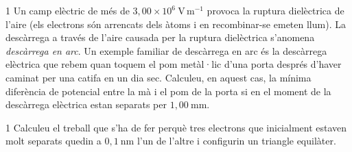 
\begin{apartat}{1}
Un camp elèctric de més de $3,00\times 10^{6}\ \mathrm{V\,m^{-1}}$ provoca la ruptura dielèctrica de l'aire (els electrons són arrencats dels àtoms i en recombinar-se emeten llum). La descàrrega a través de l'aire causada per la ruptura dielèctrica s'anomena \textit{descàrrega en arc}. Un exemple familiar de descàrrega en arc és la descàrrega elèctrica que rebem quan toquem el pom metàl·lic d'una porta després d'haver caminat per una catifa en un dia sec. Calculeu, en aquest cas, la mínima diferència de potencial entre la mà i el pom de la porta si en el moment de la descàrrega elèctrica estan separats per $1,00\ \mathrm{mm}$.
\end{apartat}

\begin{apartat}{1}
Calculeu el treball que s'ha de fer perquè tres electrons que inicialment estaven molt separats quedin a $0,1\ \mathrm{nm}$ l'un de l'altre i configurin un triangle equilàter.
\end{apartat}

